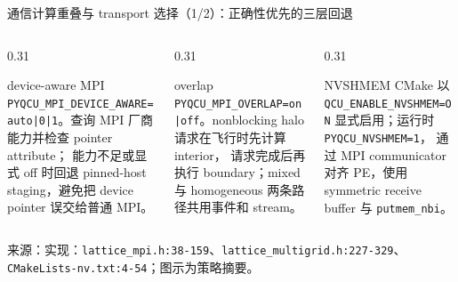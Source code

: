 \documentclass[UTF8,aspectratio=169,11pt]{ctexbeamer}
\newcommand{\source}[1]{%
  \vspace{0.06em}\par{\raggedright\scriptsize\color{muted}来源：#1\par}}
\newcommand{\code}[1]{\nolinkurl{#1}}
\begin{document}
\begin{frame}[t]{通信计算重叠与 transport 选择（1/2）：正确性优先的三层回退}
  \begin{columns}[T,totalwidth=\textwidth]
    \begin{column}{0.31\textwidth}
      \begin{block}{device-aware MPI}
        \small
        \code{PYQCU_MPI_DEVICE_AWARE=auto|0|1}。查询 MPI 厂商能力并检查 pointer attribute；
        能力不足或显式 off 时回退 pinned-host staging，避免把 device pointer 误交给普通 MPI。
      \end{block}
    \end{column}
    \begin{column}{0.31\textwidth}
      \begin{block}{overlap}
        \small
        \code{PYQCU_MPI_OVERLAP=on|off}。nonblocking halo 请求在飞行时先计算 interior，
        请求完成后再执行 boundary；mixed 与 homogeneous 两条路径共用事件和 stream。
      \end{block}
    \end{column}
    \begin{column}{0.31\textwidth}
      \begin{block}{NVSHMEM}
        \small
        CMake 以 \code{QCU_ENABLE_NVSHMEM=ON} 显式启用；运行时 \code{PYQCU_NVSHMEM=1}，
        通过 MPI communicator 对齐 PE，使用 symmetric receive buffer 与 \code{putmem_nbi}。
      \end{block}
    \end{column}
  \end{columns}
  \vspace{0.18em}
  \begin{center}
    \small
  \end{center}
  \source{实现：\code{lattice_mpi.h:38-159}、\code{lattice_multigrid.h:227-329}、\code{CMakeLists-nv.txt:4-54}；图示为策略摘要。}
\end{frame}
\end{document}
